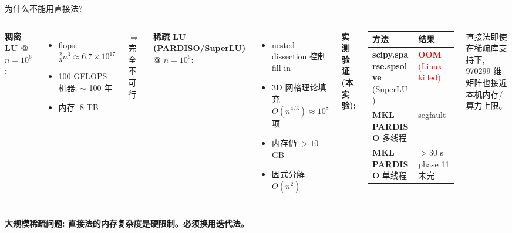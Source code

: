\documentclass[12pt,aspectratio=169]{beamer}
\begin{document}
\begin{frame}[shrink]{为什么不能用直接法?}

\begin{columns}[T]
\textbf{稠密 LU @ $n=10^6$:}
\begin{itemize}\itemsep1pt
  \item flops: $\frac{2}{3} n^3 \approx 6.7 \times 10^{17}$
  \item 100 GFLOPS 机器: $\sim$ 100 年
  \item 内存: 8 TB
\end{itemize}
$\Rightarrow$ 完全不可行

\vspace{4pt}
\textbf{稀疏 LU (PARDISO/SuperLU) @ $n=10^6$:}
\begin{itemize}\itemsep1pt
  \item nested dissection 控制 fill-in
  \item 3D 网格理论填充 $O(n^{4/3}) \approx 10^8$ 项
  \item 内存仍 $> 10$ GB
  \item 因式分解 $O(n^2)$
\end{itemize}

\textbf{实测验证 (本实验):}

\vspace{2pt}
\footnotesize
\begin{tabular}{@{}p{3.5cm}l@{}}
\toprule
方法                                 & 结果 \\
\midrule
\textbf{scipy.sparse.spsolve} (SuperLU)\quad & \textcolor{red}{\textbf{OOM} (Linux killed)} \\
\textbf{MKL PARDISO} 多线程           & segfault \\
\textbf{MKL PARDISO} 单线程           & $>30$ s phase 11 未完 \\
\bottomrule
\end{tabular}
\normalsize

\vspace{4pt}
\small
直接法即使在稀疏库支持下, 970299 维矩阵也接近本机内存/算力上限。
\end{columns}

\vspace{6pt}
\begin{block}{}
\small \textbf{大规模稀疏问题: 直接法的内存复杂度是硬限制。必须换用迭代法。}
\end{block}
\end{frame}
\end{document}

